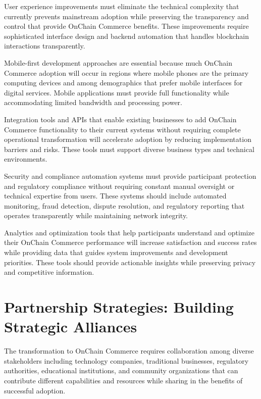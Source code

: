 \documentclass[
  Letterpaper,
]{scrbook}
\begin{document}
User experience improvements must eliminate the technical complexity
that currently prevents mainstream adoption while preserving the
transparency and control that provide OnChain Commerce benefits. These
improvements require sophisticated interface design and backend
automation that handles blockchain interactions transparently.

Mobile-first development approaches are essential because much OnChain
Commerce adoption will occur in regions where mobile phones are the
primary computing devices and among demographics that prefer mobile
interfaces for digital services. Mobile applications must provide full
functionality while accommodating limited bandwidth and processing
power.

Integration tools and APIs that enable existing businesses to add
OnChain Commerce functionality to their current systems without
requiring complete operational transformation will accelerate adoption
by reducing implementation barriers and risks. These tools must support
diverse business types and technical environments.

Security and compliance automation systems must provide participant
protection and regulatory compliance without requiring constant manual
oversight or technical expertise from users. These systems should
include automated monitoring, fraud detection, dispute resolution, and
regulatory reporting that operates transparently while maintaining
network integrity.

Analytics and optimization tools that help participants understand and
optimize their OnChain Commerce performance will increase satisfaction
and success rates while providing data that guides system improvements
and development priorities. These tools should provide actionable
insights while preserving privacy and competitive information.

\section{Partnership Strategies: Building Strategic
Alliances}\label{partnership-strategies-building-strategic-alliances}

The transformation to OnChain Commerce requires collaboration among
diverse stakeholders including technology companies, traditional
businesses, regulatory authorities, educational institutions, and
community organizations that can contribute different capabilities and
resources while sharing in the benefits of successful adoption.
\end{document}
